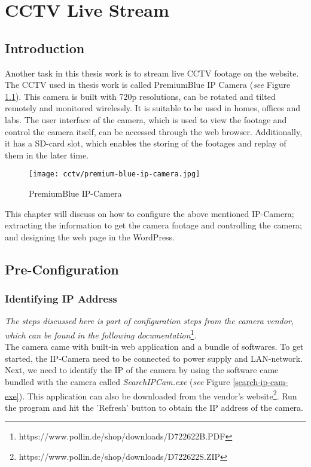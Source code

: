 \chapter{CCTV Live Stream}

\section{Introduction}
Another task in this thesis work is to stream live CCTV footage on the website. The CCTV used in thesis work is called PremiumBlue IP Camera (\emph{see} Figure \ref{premium-blue-ip-camera}). This camera is built with 720p resolutions, can be rotated and tilted remotely and monitored wirelessly. It is suitable to be used in homes, offices and labs. The user interface of the camera, which is used to view the footage and control the camera itself, can be accessed through the web browser. Additionally, it has a SD-card slot, which enables the storing of the footages and replay of them in the later time.

\begin{figure}[h]
\caption{PremiumBlue IP-Camera}
\label{premium-blue-ip-camera}
\centering
\texttt{[image: cctv/premium-blue-ip-camera.jpg]}
\end{figure}

This chapter will discuss on how to configure the above mentioned IP-Camera; extracting the information to get the camera footage and controlling the camera; and designing the web page in the WordPress.

\section{Pre-Configuration}
\subsection{Identifying IP Address}\label{sec:cctv-identifying-ip-address}
\emph{The steps discussed here is part of configuration steps from the camera vendor, which can be found in the following documentation}\footnote{https://www.pollin.de/shop/downloads/D722622B.PDF}.\\

The camera came with built-in web application and a bundle of softwares. To get started, the IP-Camera need to be connected to power supply and LAN-network. Next, we need to identify the IP of the camera by using the software came bundled with the camera called \emph{SearchIPCam.exe} (\emph{see} Figure \ref{search-ip-cam-exe}). This application can also be downloaded from the vendor's website\footnote{https://www.pollin.de/shop/downloads/D722622S.ZIP}. Run the program and hit the 'Refresh' button to obtain the IP address of the camera.

